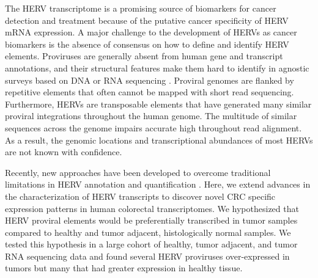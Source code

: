 The HERV transcriptome is a promising source of biomarkers for cancer detection and treatment because of the putative cancer specificity of HERV mRNA expression.
A major challenge to the development of HERVs as cancer biomarkers is the absence of consensus on how to define and identify HERV elements.
Proviruses are generally absent from human gene and transcript annotations, and their structural features make them hard to identify in agnostic surveys based on DNA or RNA sequencing \citep{ERVmap2018, Treangen2011}.
Proviral genomes are flanked by repetitive elements that often cannot be mapped with short read sequencing.
Furthermore, HERVs are transposable elements that have generated many similar proviral integrations throughout the human genome.
The multitude of similar sequences across the genome impairs accurate high throughout read alignment.
As a result, the genomic locations and transcriptional abundances of most HERVs are not known with confidence.

Recently, new approaches have been developed to overcome traditional limitations in HERV annotation and quantification \citep{Attig2017, Attig2019, ERVmap2018, Telescope2019, Grabski2020}.
Here, we extend advances in the characterization of HERV transcripts to discover novel CRC specific expression patterns in human colorectal transcriptomes.
We hypothesized that HERV proviral elements would be preferentially transcribed in tumor samples compared to healthy and tumor adjacent, histologically normal samples.
We tested this hypothesis in a large cohort of healthy, tumor adjacent, and tumor RNA sequencing data and found several HERV proviruses over-expressed in tumors but many that had greater expression in healthy tissue.
